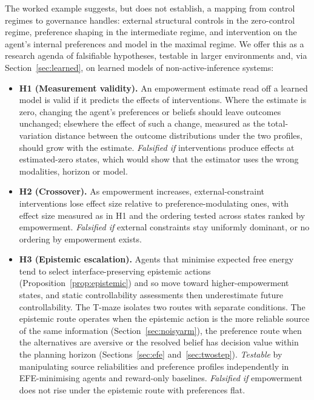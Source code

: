 \documentclass[pdflatex,sn-apa]{sn-jnl}%
\theoremstyle{definition}
\begin{document}
The worked example suggests, but does not establish, a mapping from control regimes to governance handles: external structural controls in the zero-control regime, preference shaping in the intermediate regime, and intervention on the agent's internal preferences and model in the maximal regime. We offer this as a research agenda of falsifiable hypotheses, testable in larger environments and, via Section~\ref{sec:learned}, on learned models of non-active-inference systems:
\begin{itemize}
    \item \textbf{H1 (Measurement validity).} An empowerment estimate read off a learned model is valid if it predicts the effects of interventions. Where the estimate is zero, changing the agent's preferences or beliefs should leave outcomes unchanged; elsewhere the effect of such a change, measured as the total-variation distance between the outcome distributions under the two profiles, should grow with the estimate. \emph{Falsified if} interventions produce effects at estimated-zero states, which would show that the estimator uses the wrong modalities, horizon or model.
    \item \textbf{H2 (Crossover).} As empowerment increases, external-constraint interventions lose effect size relative to preference-modulating ones, with effect size measured as in H1 and the ordering tested across states ranked by empowerment. \emph{Falsified if} external constraints stay uniformly dominant, or no ordering by empowerment exists.
    \item \textbf{H3 (Epistemic escalation).} Agents that minimise expected free energy tend to select interface-preserving epistemic actions (Proposition~\ref{prop:epistemic}) and so move toward higher-empowerment states, and static controllability assessments then underestimate future controllability. The T-maze isolates two routes with separate conditions. The epistemic route operates when the epistemic action is the more reliable source of the same information (Section~\ref{sec:noisyarm}), the preference route when the alternatives are aversive or the resolved belief has decision value within the planning horizon (Sections~\ref{sec:efe} and~\ref{sec:twostep}). \emph{Testable} by manipulating source reliabilities and preference profiles independently in EFE-minimising agents and reward-only baselines. \emph{Falsified if} empowerment does not rise under the epistemic route with preferences flat.
\end{itemize}
\end{document}
